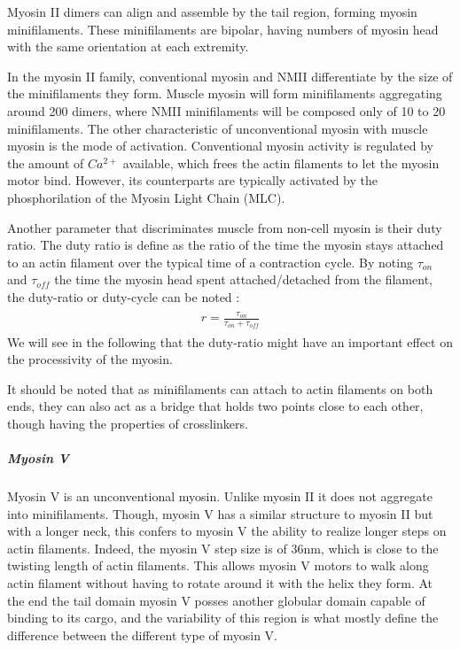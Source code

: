 \documentclass[A4paperpaper,11pt,english]{sphinxmanual}
\begin{document}
Myosin II dimers can align and assemble by the tail region, forming myosin
minifilaments. These minifilaments are bipolar, having numbers of myosin head
with the same orientation at each extremity.

In the myosin II family, conventional myosin and NMII differentiate by the
size of the minifilaments they form. Muscle myosin will form minifilaments
aggregating around 200 dimers, where NMII minifilaments will be composed  only
of 10 to 20 minifilaments. The other characteristic of unconventional myosin
with muscle myosin is the mode of activation. Conventional myosin activity is
regulated by the amount of \(Ca^{2+}\) available, which frees the actin filaments to let the myosin motor bind. However, its
counterparts are typically activated by the phosphorilation of the Myosin Light Chain (MLC).

Another parameter that discriminates muscle from non-cell myosin is their duty
ratio.  The duty ratio is define as the ratio of the time the myosin stays
attached to an actin filament over the typical time of a contraction cycle.
By noting \(\tau_{on}\) and \(\tau_{off}\) the time the myosin head
spent attached/detached from  the filament, the duty-ratio or duty-cycle can
be noted :
\label{index-latex:equation-roa2}\begin{gather}
\begin{split}r = \frac{\tau_{on}}{\tau_{on}+\tau_{off}}\end{split}\label{index-latex-roa2}
\end{gather}
We will see in the following that the duty-ratio might have an important effect
on the processivity of the myosin.

It should be noted that as minifilaments can attach to actin filaments on both
ends, they can also act as a bridge that holds two points close to each other,
though having the properties of crosslinkers.


\subparagraph{Myosin V}
\label{index-latex:myosin-v}
Myosin V is an unconventional myosin. Unlike myosin II it does not aggregate
into minifilaments.  Though, myosin V has a similar structure to myosin II but
with a longer neck, this confers to myosin V the ability to realize longer
steps on actin filaments. Indeed, the myosin V step size is of 36nm, which is close to the
twisting length of actin filaments. This allows myosin V motors to walk along
actin filament without having to rotate around it with the helix they form. At the end the tail domain
myosin V posses another globular domain capable of binding to its cargo, and
the variability of this region is what mostly define the difference between the
different type of myosin V.
\end{document}
